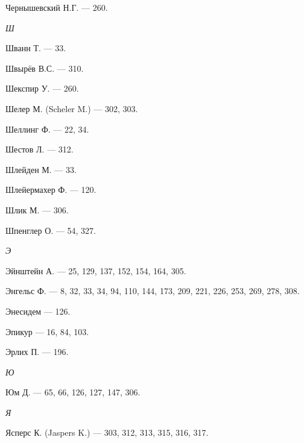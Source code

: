 \documentclass[a4paper,14pt,russian]{extreport}
\begin{document}
Чернышевский Н.Г. --- 260.

\emph{Ш}

Шванн Т. --- 33.

Швырёв В.С. --- 310.

Шекспир У. --- 260.

Шелер М. (Scheler M.) --- 302, 303.

Шеллинг Ф. --- 22, 34.

Шестов Л. --- 312.

Шлейден М. --- 33.

Шлейермахер Ф. --- 120.

Шлик М. --- 306.

Шпенглер О. --- 54, 327.

\emph{Э}

Эйнштейн А. --- 25, 129, 137, 152, 154, 164, 305.

Энгельс Ф. --- 8, 32, 33, 34, 94, 110, 144, 173, 209, 221, 226, 253, 269, 278, 308.

Энесидем --- 126.

Эпикур --- 16, 84, 103.

Эрлих П. --- 196.

\emph{Ю}

Юм Д. --- 65, 66, 126, 127, 147, 306.

\emph{Я}

Ясперс К. (Jaspers K.) --- 303, 312, 313, 315, 316, 317.
\end{document}
